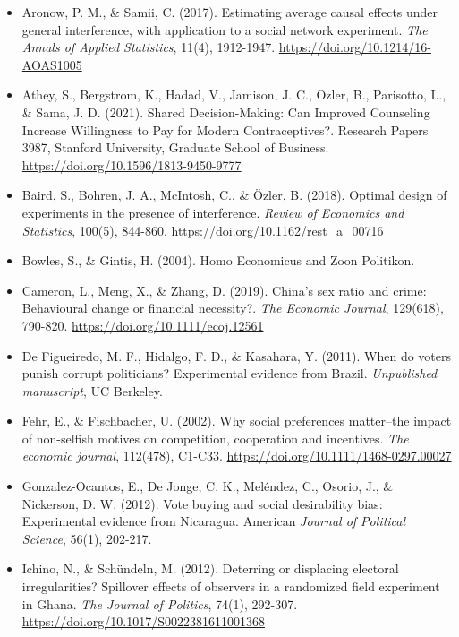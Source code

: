 \documentclass[letterpaper,12pt,parskip=full,DIV=10]{scrartcl}
\begin{document}
\begin{itemize}

\item Aronow, P. M., \& Samii, C. (2017). Estimating average causal effects under general interference, with application to a social network experiment. \emph{The Annals of Applied Statistics}, 11(4), 1912-1947. \url{https://doi.org/10.1214/16-AOAS1005}

\item Athey, S., Bergstrom, K., Hadad, V., Jamison, J. C., Ozler, B., Parisotto, L., \& Sama, J. D. (2021). Shared Decision-Making: Can Improved Counseling Increase Willingness to Pay for Modern Contraceptives?. Research Papers 3987, Stanford University, Graduate School of Business. \url{https://doi.org/10.1596/1813-9450-9777}

\item Baird, S., Bohren, J. A., McIntosh, C., \& Özler, B. (2018). Optimal design of experiments in the presence of interference. \emph{Review of Economics and Statistics}, 100(5), 844-860. \url{https://doi.org/10.1162/rest_a_00716}

\item Bowles, S., \& Gintis, H. (2004). Homo Economicus and Zoon Politikon.

\item Cameron, L., Meng, X., \& Zhang, D. (2019). China's sex ratio and crime: Behavioural change or financial necessity?. \emph{The Economic Journal}, 129(618), 790-820. \url{https://doi.org/10.1111/ecoj.12561}

\item De Figueiredo, M. F., Hidalgo, F. D., \& Kasahara, Y. (2011). When do voters punish corrupt politicians? Experimental evidence from Brazil. \emph{Unpublished manuscript}, UC Berkeley.

\item Fehr, E., \& Fischbacher, U. (2002). Why social preferences matter--the impact of non-selfish motives on competition, cooperation and incentives. \emph{The economic journal}, 112(478), C1-C33.  \url{https://doi.org/10.1111/1468-0297.00027}

\item Gonzalez-Ocantos, E., De Jonge, C. K., Meléndez, C., Osorio, J., \& Nickerson, D. W. (2012). Vote buying and social desirability bias: Experimental evidence from Nicaragua. American \emph{Journal of Political Science}, 56(1), 202-217.

\item Ichino, N., \& Schündeln, M. (2012). Deterring or displacing electoral irregularities? Spillover effects of observers in a randomized field experiment in Ghana. \emph{The Journal of Politics}, 74(1), 292-307. \url{https://doi.org/10.1017/S0022381611001368}


\end{itemize}
\end{document}

